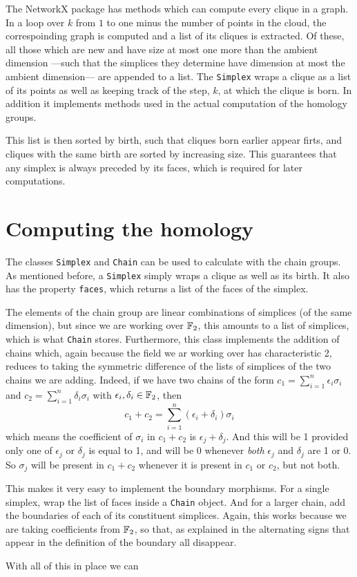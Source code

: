 \documentclass[../main.tex]{subfiles}
\begin{document}
The \textsf{NetworkX} package has methods which can compute every clique in a graph. In a
loop over \( k \) from \( 1 \) to one minus the number of points in the cloud, the
correspoinding \MKNN graph is computed and a list of its cliques is extracted. Of these,
all those which are new and have size at most one more than the ambient dimension ---such
that the simplices they determine have dimension at most the ambient dimension--- are
appended to a list. The \texttt{Simplex} wraps a clique as a list of its points as well as
keeping track of the step, \( k \), at which the clique is born. In addition it implements
methods used in the actual computation of the homology groups.

This list is then sorted by birth, such that cliques born earlier appear firts, and
cliques with the same birth are sorted by increasing size. This guarantees that any
simplex is always preceded by its faces, which is required for later computations. 

\section{Computing the homology}
The classes \texttt{Simplex} and \texttt{Chain} can be used to calculate with the chain
groups. As mentioned before, a \texttt{Simplex} simply wraps a clique as well as its
birth. It also has the property \texttt{faces}, which returns a list of the faces of the
simplex.

The elements of the chain group are linear combinations of simplices (of the same
dimension), but since we are working over \( \mathbb{F}_2 \), this amounts to a list of simplices,
which is what \texttt{Chain} stores. Furthermore, this class implements the addition of
chains which, again because the field we ar working over has characteristic 2, reduces to
taking the symmetric difference of the lists of simplices of the two chains we are adding.
Indeed, if we have two chains of the form \( c_1 = \sum_{i = 1}^{n} \epsilon_i \sigma_i \)
and \( c_2 = \sum_{i = 1}^{n} \delta_i \sigma_i \) with \( \epsilon_i, \delta_i \in \mathbb{F}_2
\), then
\begin{equation*}
	c_1 + c_2 = \sum_{i = 1}^{n} (\epsilon_i + \delta_i) \sigma_i
\end{equation*}
which means the coefficient of \( \sigma_i \) in \( c_1 + c_2 \) is \( \epsilon_j +
\delta_j \). And this will be 1 provided only one of \( \epsilon_j \) or \( \delta_j \) is
equal to 1, and will be 0 whenever \emph{both} \( \epsilon_j \) and \( \delta_j \) are 1
or 0. So \( \sigma_j \) will be present in \( c_1 + c_2 \) whenever it is present in \(
c_1 \) or \( c_2 \), but not both. 

This makes it very easy to implement the boundary morphisms. For a single simplex, wrap
the list of faces inside a \texttt{Chain} object. And for a larger chain, add the
boundaries of each of its constituent simplices. Again, this works because we are taking
coefficients from \( \mathbb{F}_2 \), so that, as explained in 
the alternating signs that appear in the definition of the boundary all disappear. 

With all of this in place we can 
\end{document}
